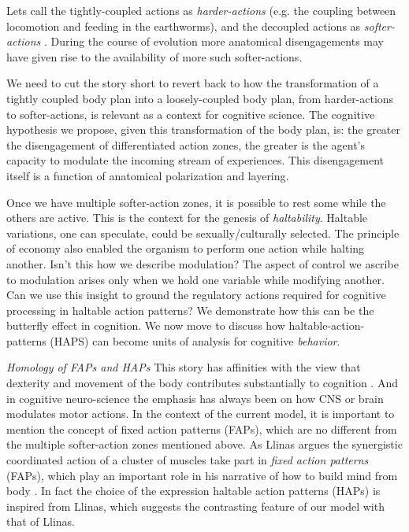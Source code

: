 {{{{{Lets call the tightly-coupled actions as \textit{harder-actions} (e.g. the coupling between locomotion and feeding in the earthworms), and the decoupled actions as \textit{softer-actions} \cite{nagarjuna_muscularity_2005}. During the course of evolution more anatomical disengagements may have given rise to the availability of more such softer-actions. 

We need to cut the story short to revert back to how the transformation of a tightly coupled body plan into a loosely-coupled body plan, from harder-actions to softer-actions, is relevant as a context for cognitive science. The cognitive hypothesis we propose, given this transformation of the body plan, is: the greater the disengagement of differentiated action zones, the greater is the agent's capacity to modulate the incoming stream of experiences. This disengagement itself is a function of anatomical polarization and layering. 

Once we have multiple softer-action zones, it is possible to rest some while the others are active. This is the context for the genesis of \textit{haltability}. Haltable variations, one can speculate, could be sexually/culturally selected. The principle of economy also enabled the organism to perform one action while halting another. Isn't this how we describe modulation? The aspect of control we ascribe to modulation arises only when we hold one variable while modifying another. Can we use this insight to ground the regulatory actions required for cognitive processing in haltable action patterns?  We demonstrate how this can be the butterfly effect in cognition. We now move to discuss how haltable-action-patterns (HAPS) can become units of analysis for cognitive \textit{behavior}. 

\emph{Homology of FAPs and HAPs} This story has affinities with the view that dexterity and movement of the body contributes substantially to cognition \cite{bernstein2014dexterity}. And in cognitive neuro-science the emphasis has always been on how CNS or brain modulates motor actions. In the context of the current model, it is important to mention the concept of fixed action patterns (FAPs), which are no different from the multiple softer-action zones mentioned above. As Llinas argues the synergistic coordinated action of a cluster of muscles take part in \textit{fixed action patterns} (FAPs), which play an important role in his narrative of how to build mind from body \cite{llinas2002vortex}. In fact the choice of the expression haltable action patterns (HAPs) is inspired from Llinas, which suggests the contrasting feature of our model with that of Llinas. 

}}}}}
